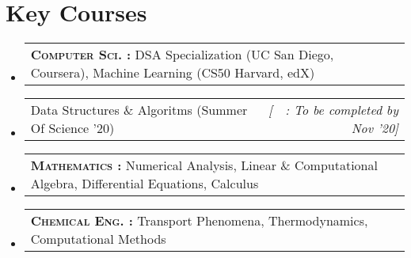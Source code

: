 \documentclass[a4paper,11pt]{article}
\makeatletter
\newcommand{\resumeSubSubheading}[2]{
    \item
    \begin{tabular*}{0.977\textwidth}{l@{\extracolsep{\fill}}r}
      \small#1 & \textit{\small #2} \\
    \end{tabular*}\vspace{-7pt}
}
\newcommand{\resumeSubHeadingListStart}{\begin{itemize}[leftmargin=-0pt, label={}]}
\newcommand{\resumeSubHeadingListEnd}{\end{itemize}}
\makeatother
\begin{document}
  \section{Key Courses}
    \begin{adjustwidth}{10.8pt}{}
    \resumeSubHeadingListStart
      \resumeSubSubheading 
        {\textbf{\textsc{Computer Sci. : }}DSA Specialization (UC San Diego, Coursera), Machine Learning\textsuperscript{\textdagger} (CS50 Harvard, edX)}{}\vspace{-0.35cm}
      \resumeSubSubheading
        {\hspace{3.05cm}Data Structures \& Algoritms (Summer Of Science '20)}{[\ \textdagger\ : To be completed by Nov '20]}
      \vspace{-0.35cm}
      \resumeSubSubheading
        {\textbf{\textsc{Mathematics \hspace{3.5mm}: }}Numerical Analysis, Linear \& Computational Algebra, Differential Equations, Calculus}{}
      \vspace{-0.35cm}
      \resumeSubSubheading
        {\textbf{\textsc{Chemical Eng. : }}Transport Phenomena\textsuperscript{\textdagger}, Thermodynamics\textsuperscript{\textdagger}, Computational Methods\textsuperscript{\textdagger}}{}
        \vspace{-0.3cm}
    \resumeSubHeadingListEnd    
    
    \end{adjustwidth}

\end{document}
